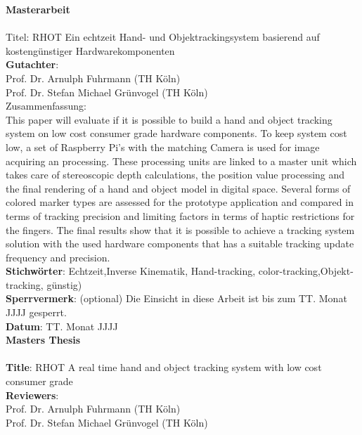 \begin{titlepage}
\begin{figure}[!ht]
\begin{flushright}
\end{flushright}
\end{figure}
\newpage
\setcounter{page}{1}
\huge\textbf{Masterarbeit}\\\\
\large
Titel: RHOT Ein echtzeit Hand- und Objektrackingsystem basierend auf kostengünstiger Hardwarekomponenten\\
\textbf{Gutachter}:\\
	Prof. Dr. Arnulph Fuhrmann (TH Köln)\\
	Prof. Dr. Stefan Michael Grünvogel (TH Köln)\\
Zusammenfassung:\\ This paper will evaluate if it is possible to build a hand and object tracking system on low cost consumer grade hardware components. To keep system cost low, a set of Raspberry Pi's with the matching Camera is used for image acquiring an processing. These processing units are linked to a master unit which takes care of stereoscopic depth calculations, the position value processing and the final rendering of a hand and object model in digital space. Several forms of colored marker types are assessed for the prototype application and compared in terms of tracking precision and limiting factors in terms of haptic restrictions for the fingers. The final results show that it is possible to achieve a tracking system solution with the used hardware components that has a suitable tracking update frequency and precision.\\
\textbf{Stichwörter}: Echtzeit,Inverse Kinematik, Hand-tracking, color-tracking,Objekt-tracking, günstig)\\
\textbf{Sperrvermerk}: (optional) Die Einsicht in diese Arbeit ist bis zum TT. Monat JJJJ gesperrt.\\
\textbf{Datum}: TT. Monat JJJJ\\
\newpage
\huge \textbf{Masters Thesis}\\\\
\large
\textbf{Title}: RHOT A real time hand and object tracking system with low cost consumer grade\\
\textbf{Reviewers}:\\
	Prof. Dr. Arnulph Fuhrmann (TH Köln)\\
	Prof. Dr. Stefan Michael Grünvogel (TH Köln)\\

\end{titlepage}
